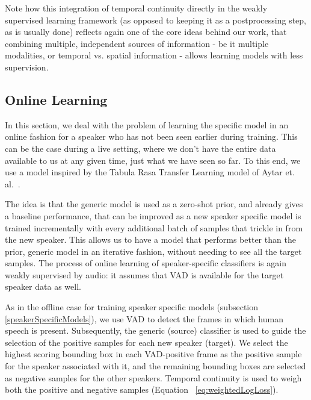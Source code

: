 \documentclass[runningheads]{llncs}
\begin{document}
Note how this integration of temporal continuity directly in the weakly supervised learning framework (as opposed to keeping it as a postprocessing step, as is usually done) reflects again one of the core ideas behind our work, that combining multiple, independent sources of information - be it multiple modalities, or temporal vs. spatial information - allows learning models with less supervision. 


\subsection{Online Learning}
\label{onlineLearning}
In this section, we deal with the problem of learning the specific model in an online fashion for a speaker who has not been seen earlier during training. This can be the case during a live setting, where we don't have the entire data available to us at any given time, just what we have seen so far. To this end, we use a model inspired by the Tabula Rasa Transfer Learning model of Aytar et. al.~\cite{Aytar11}.

The idea is that the generic model is used as a zero-shot prior, and already gives a baseline performance, that can be improved as a new speaker specific model is trained incrementally with every additional batch of samples that trickle in from the new speaker. This allows us to have a model that performs better than the prior, generic model in an iterative fashion, without needing to see all the target samples. 
%
The process of online learning of speaker-specific classifiers is again weakly supervised by audio: it assumes that VAD is available for the target speaker data as well.

As in the offline case for training speaker specific models (subsection \ref{speakerSpecificModels}), we use VAD to detect the frames in which human speech is present. Subsequently, the generic (source) classifier is used to guide the selection of the positive samples for each new speaker (target). We select the highest scoring bounding box in each VAD-positive frame as the positive sample for the speaker associated with it, and the remaining bounding boxes are selected as negative samples for the other speakers. Temporal continuity is used to weigh both the positive and negative samples (Equation ~\ref{eq:weightedLogLoss}).
\end{document}
